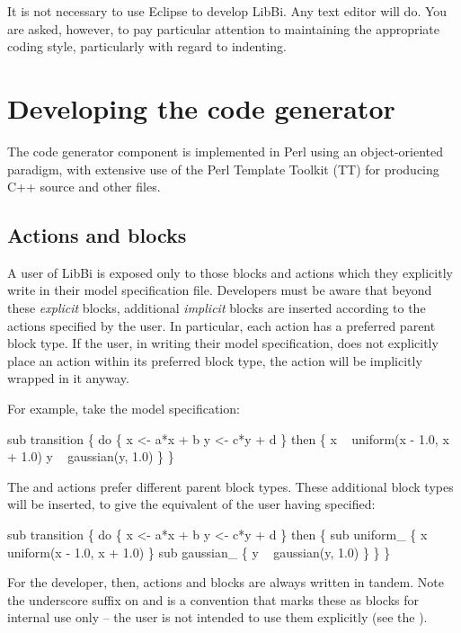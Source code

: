 It is not necessary to use Eclipse to develop LibBi. Any text editor will
do. You are asked, however, to pay particular attention to maintaining the
appropriate coding style, particularly with regard to
indenting.

\section{Developing the code generator}

The code generator component is implemented in Perl using an object-oriented
paradigm, with extensive use of the Perl Template Toolkit (TT) for producing
C++ source and other files.

\subsection{Actions and blocks}

A user of LibBi is exposed only to those blocks and actions which they
explicitly write in their model specification file. Developers must be aware
that beyond these \textit{explicit} blocks, additional \textit{implicit}
blocks are inserted according to the actions specified by the user. In
particular, each action has a preferred parent block type. If the user, in
writing their model specification, does not explicitly place an action within
its preferred block type, the action will be implicitly wrapped in it anyway.

For example, take the model specification:
\begin{bicode}
sub transition \{
  do \{
    x <- a*x + b
    y <- c*y + d
  \} then \{
    x ~ uniform(x - 1.0, x + 1.0)
    y ~ gaussian(y, 1.0)
  \}
\}
\end{bicode}
The  and  actions prefer different
parent block types. These additional block types will be inserted, to give the
equivalent of the user having specified:
\begin{bicode}
sub transition \{
  do \{
    x <- a*x + b
    y <- c*y + d
  \} then \{
    sub uniform_ \{
      x ~ uniform(x - 1.0, x + 1.0)
    \}
    sub gaussian_ \{
      y ~ gaussian(y, 1.0)
    \}
  \}  
\}
\end{bicode}

For the developer, then, actions and blocks are always written in tandem.
Note the underscore suffix on  and  is a
convention that marks these as blocks for internal use only -- the user is not
intended to use them explicitly (see the ).

